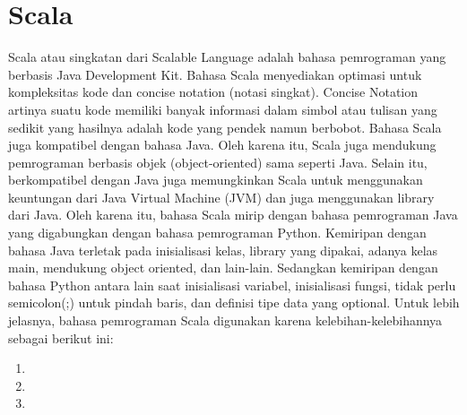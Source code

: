 \section{Scala}
\label{sec:scala}
Scala atau singkatan dari Scalable Language adalah bahasa pemrograman yang berbasis Java Development Kit. Bahasa Scala menyediakan optimasi untuk kompleksitas kode dan concise notation (notasi singkat). Concise Notation artinya suatu kode memiliki banyak informasi dalam simbol atau tulisan yang sedikit yang hasilnya adalah kode yang pendek namun berbobot. Bahasa Scala juga kompatibel dengan bahasa Java. Oleh karena itu, Scala juga mendukung pemrograman berbasis objek (object-oriented) sama seperti Java. Selain itu, berkompatibel dengan Java juga memungkinkan Scala untuk menggunakan keuntungan dari Java Virtual Machine (JVM) dan juga menggunakan library dari Java. Oleh karena itu, bahasa Scala mirip dengan bahasa pemrograman Java yang digabungkan dengan bahasa pemrograman Python. Kemiripan dengan bahasa Java terletak pada inisialisasi kelas, library yang dipakai, adanya kelas main, mendukung object oriented, dan lain-lain. Sedangkan kemiripan dengan bahasa Python antara lain saat inisialisasi variabel, inisialisasi fungsi, tidak perlu semicolon(;) untuk pindah baris, dan definisi tipe data yang optional.
Untuk lebih jelasnya, bahasa pemrograman Scala digunakan karena kelebihan-kelebihannya sebagai berikut ini:

\begin{enumerate}
\item 
\item 
\item 
\end{enumerate}


